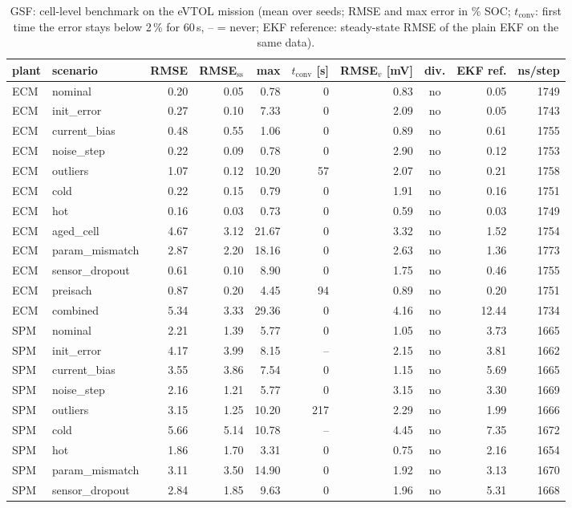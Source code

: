 \begin{table}[H]\centering\footnotesize\setlength{\tabcolsep}{4pt}
\caption{GSF: cell-level benchmark on the eVTOL mission (mean over seeds; RMSE and max error in \% SOC; $t_\mathrm{conv}$: first time the error stays below 2\,\% for 60\,s, -- = never; EKF reference: steady-state RMSE of the plain EKF on the same data).}\label{tab:cell_GSF}
\begin{tabular}{llrrrrrcrr}\toprule
plant & scenario & RMSE & RMSE$_\mathrm{ss}$ & max & $t_\mathrm{conv}$ [s] & RMSE$_v$ [mV] & div. & EKF ref. & ns/step \\ \midrule
ECM & nominal & 0.20 & 0.05 & 0.78 & 0 & 0.83 & no & 0.05 & 1749 \\
ECM & init\_error & 0.27 & 0.10 & 7.33 & 0 & 2.09 & no & 0.05 & 1743 \\
ECM & current\_bias & 0.48 & 0.55 & 1.06 & 0 & 0.89 & no & 0.61 & 1755 \\
ECM & noise\_step & 0.22 & 0.09 & 0.78 & 0 & 2.90 & no & 0.12 & 1753 \\
ECM & outliers & 1.07 & 0.12 & 10.20 & 57 & 2.07 & no & 0.21 & 1758 \\
ECM & cold & 0.22 & 0.15 & 0.79 & 0 & 1.91 & no & 0.16 & 1751 \\
ECM & hot & 0.16 & 0.03 & 0.73 & 0 & 0.59 & no & 0.03 & 1749 \\
ECM & aged\_cell & 4.67 & 3.12 & 21.67 & 0 & 3.32 & no & 1.52 & 1754 \\
ECM & param\_mismatch & 2.87 & 2.20 & 18.16 & 0 & 2.63 & no & 1.36 & 1773 \\
ECM & sensor\_dropout & 0.61 & 0.10 & 8.90 & 0 & 1.75 & no & 0.46 & 1755 \\
ECM & preisach & 0.87 & 0.20 & 4.45 & 94 & 0.89 & no & 0.20 & 1751 \\
ECM & combined & 5.34 & 3.33 & 29.36 & 0 & 4.16 & no & 12.44 & 1734 \\
\midrule
SPM & nominal & 2.21 & 1.39 & 5.77 & 0 & 1.05 & no & 3.73 & 1665 \\
SPM & init\_error & 4.17 & 3.99 & 8.15 & -- & 2.15 & no & 3.81 & 1662 \\
SPM & current\_bias & 3.55 & 3.86 & 7.54 & 0 & 1.15 & no & 5.69 & 1665 \\
SPM & noise\_step & 2.16 & 1.21 & 5.77 & 0 & 3.15 & no & 3.30 & 1669 \\
SPM & outliers & 3.15 & 1.25 & 10.20 & 217 & 2.29 & no & 1.99 & 1666 \\
SPM & cold & 5.66 & 5.14 & 10.78 & -- & 4.45 & no & 7.35 & 1672 \\
SPM & hot & 1.86 & 1.70 & 3.31 & 0 & 0.75 & no & 2.16 & 1654 \\
SPM & param\_mismatch & 3.11 & 3.50 & 14.90 & 0 & 1.92 & no & 3.13 & 1670 \\
SPM & sensor\_dropout & 2.84 & 1.85 & 9.63 & 0 & 1.96 & no & 5.31 & 1668 \\
\bottomrule\end{tabular}\end{table}
